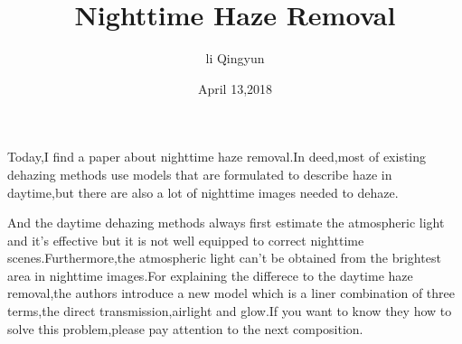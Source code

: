 \documentclass{article}
\author{li Qingyun}
\date{April 13,2018}
\title{Nighttime Haze Removal}
\begin{document}
\maketitle
\par Today,I find a paper about nighttime haze removal.In deed,most of existing dehazing methods use models that are formulated to describe haze in daytime,but there are also a lot of nighttime images needed to dehaze. 
\par And the daytime dehazing methods always first estimate the atmospheric light and it's effective but it is not well equipped to correct nighttime scenes.Furthermore,the atmospheric light can't be obtained from the brightest area in nighttime images.For explaining the differece to the daytime haze removal,the authors introduce a new model which is a liner combination of three terms,the direct transmission,airlight and glow.If you want to know they how to solve this problem,please pay attention to the next composition.
\end{document}
